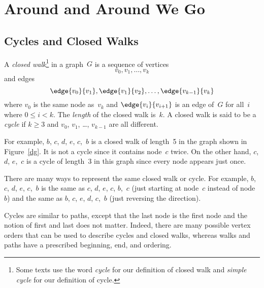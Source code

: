 \section{Around and Around We Go}

\subsection{Cycles and Closed Walks}

\begin{definition}
A \emph{closed walk}\footnote{Some texts use the word \emph{cycle} for
  our definition of closed walk and \emph{simple cycle} for our
  definition of cycle.} in a graph~$G$ is a sequence of vertices
\begin{equation*}
    v_0, v_1, \dots, v_k
\end{equation*}
and edges
\begin{equation*}
    \edge{v_0}{v_1}, \edge{v_1}{v_2}, \dots, \edge{v_{k - 1}}{v_k}
\end{equation*}
where $v_0$ is the same node as~$v_k$ and $\edge{v_i}{v_{i + 1}}$ is
an edge of~$G$ for all~$i$ where $0 \le i < k$.  The \emph{length} of
the closed walk is~$k$.  A closed walk is said to be a \emph{cycle} if
$k \ge 3$ and $v_0$, $v_1$, \dots, $v_{k - 1}$ are all different.
\end{definition}

For example, $b$, $c$, $d$, $e$, $c$,~$b$ is a closed walk of
length~5 in the graph shown in Figure~\ref{dg}.  It is not a cycle
since it contains node~$c$ twice.  On the other hand, $c$, $d$,
$e$,~$c$ is a cycle of length~3 in this graph since every node
appears just once.

There are many ways to represent the same closed walk or cycle.  For
example, $b$, $c$, $d$, $e$, $c$,~$b$ is the same as $c$, $d$, $e$,
$c$, $b$,~$c$ (just starting at node~$c$ instead of node~$b$) and the
same as $b$, $c$, $e$, $d$, $c$,~$b$ (just reversing the direction).

Cycles are similar to paths, except that the last node is the first
node and the notion of first and last does not matter.  Indeed, there
are many possible vertex orders that can be used to describe cycles
and closed walks, whereas walks and paths have a prescribed beginning,
end, and ordering.

